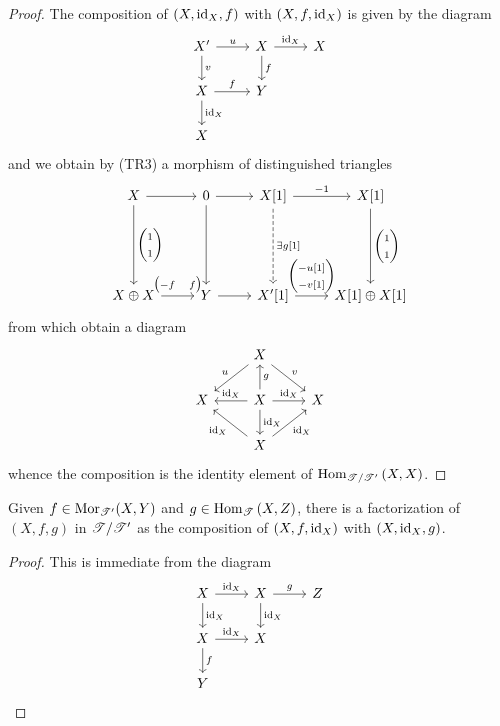 \documentclass[dissertation.tex]{subfiles}
\begin{document}
\begin{lem}
\begin{proof}
    The composition of $(X,\operatorname{id}_X,f)$ with $(X,f,\operatorname{id}_X)$ is given by the diagram
    $$\begin{tikzcd}
      X^\prime \arrow{r}{u}\arrow{d}{v} & X\arrow{d}{f}\arrow{r}{\id_X} & X\\
      X \arrow{r}{f}\arrow{d}{\id_X} & Y\\
      X
    \end{tikzcd}$$
    and we obtain by (TR3) a morphism of distinguished triangles
    $$\begin{tikzcd}[ampersand replacement=\&]
      X \arrow{r}\arrow{ddd}{\left(\begin{matrix}1\\1\end{matrix}\right)} \& 0 \arrow{r}\arrow{ddd} \& X[1] \arrow{r}{-1}\arrow[dashed]{ddd}{\exists g[1]} \& X[1]\arrow{ddd}{\left(\begin{matrix}1\\1\end{matrix}\right)}\\
      \\
      \\
      X \oplus X \arrow{r}{\left(\begin{matrix}-f & f\end{matrix}\right)} \& Y \arrow{r} \& X^\prime[1] \arrow{r}{\left(\begin{matrix}-u[1]\\-v[1]\end{matrix}\right)} \& X[1] \oplus X[1]
    \end{tikzcd}$$
    from which obtain a diagram
    $$\begin{tikzcd}
      & X \arrow[swap]{ld}{u}\arrow{rd}{v}\\
      X & X\arrow[swap]{u}{g}\arrow{d}{\id_X}\arrow{r}{\id_X}\arrow[swap]{l}{\id_X} & X\\
      & X \arrow{ul}{\id_X}\arrow[swap]{ur}{\id_X}
    \end{tikzcd}$$
    whence the composition is the identity element of $\operatorname{Hom}_{\mathscr{T}/\mathscr{T}^\prime}\left(X,X\right)$.
  \end{proof}
\end{lem}

\begin{lem}
  Given $f \in \operatorname{Mor}_{\mathscr{T}^\prime}(X,Y)$ and $g \in \operatorname{Hom}_{\mathscr{T}}\left(X,Z\right)$, there is a factorization of $(X,f,g)$ in $\mathscr{T}/\mathscr{T}^\prime$ as the composition of $(X,f,\operatorname{id}_X)$ with $(X,\operatorname{id}_X, g)$.
  \begin{proof}
    This is immediate from the diagram
    $$\begin{tikzcd}
      X \arrow{r}{\id_X}\arrow{d}{\id_X} & X \arrow{d}{\id_X}\arrow{r}{g} & Z\\
      X \arrow{r}{\id_X}\arrow{d}{f} & X\\
      Y
    \end{tikzcd}$$
  \end{proof}
\end{lem}
\end{document}
